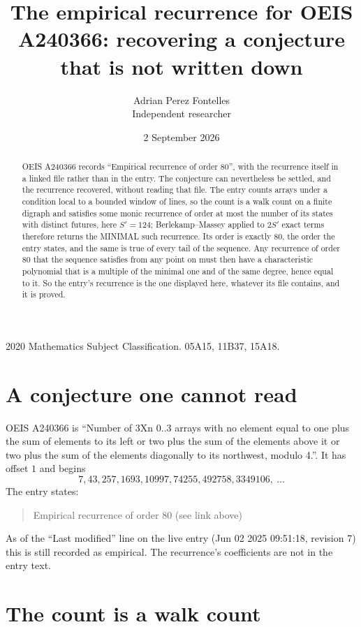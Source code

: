 \documentclass[11pt,a4paper]{article}
\title{The empirical recurrence for OEIS A240366: recovering a conjecture that is not written down}
\author{Adrian Perez Fontelles\\ \small Independent researcher}
\date{2 September 2026}
\theoremstyle{plain}
\theoremstyle{definition}
\begin{document}
\maketitle

\begin{abstract}
OEIS A240366 records ``Empirical recurrence of order $80$'', with the recurrence itself in a
linked file rather than in the entry. The conjecture can nevertheless be settled, and the
recurrence recovered, without reading that file. The entry counts arrays under a condition
local to a bounded window of lines, so the count is a walk count on a finite digraph and
satisfies some monic recurrence of order at most the number of its states with distinct
futures, here $S'=124$; Berlekamp--Massey applied to $2S'$ exact
terms therefore returns the MINIMAL such recurrence. Its order is exactly $80$, the order
the entry states, and the same is true of every tail of the sequence. Any recurrence of order
$80$ that the sequence satisfies from any point on must then have a characteristic
polynomial that is a multiple of the minimal one and of the same degree, hence equal to it. So
the entry's recurrence is the one displayed here, whatever its file contains, and it is
proved.
\end{abstract}

\noindent\small 2020 Mathematics Subject Classification. 05A15, 11B37, 15A18.\normalsize

\section{A conjecture one cannot read}

OEIS A240366 is ``Number of 3Xn 0..3 arrays with no element equal to one plus the sum of elements to its left or two plus the sum of the elements above it or two plus the sum of the elements diagonally to its northwest, modulo 4.''. It has offset $1$ and begins
\[
7, 43, 257, 1693, 10997, 74255, 492758, 3349106,\ \dots
\]
The entry states:
\begin{quote}
Empirical recurrence of order 80 (see link above)
\end{quote}
As of the ``Last modified'' line on the live entry (Jun 02 2025 09:51:18, revision 7) this is still
recorded as empirical. The recurrence's coefficients are not in the entry text.

\section{The count is a walk count}
\end{document}

